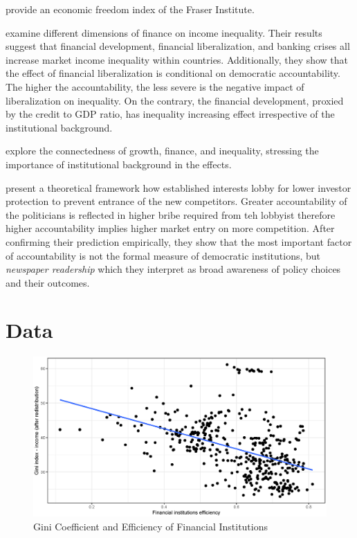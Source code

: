 \documentclass[a4paper,11pt]{article}
\begin{document}
\citet{gwartney2017} provide an economic freedom index of the Fraser Institute.

\citet{de2017finance} examine different dimensions of finance on income inequality. Their results suggest that financial development, financial liberalization, and banking crises all increase market income inequality within countries. Additionally, they show that the effect of financial liberalization is conditional on democratic accountability. The higher the accountability, the less severe is the negative impact of liberalization on inequality. On the contrary, the financial development, proxied by the credit to GDP ratio, has inequality increasing effect irrespective of the institutional background.

\citet{claessens2007finance} explore the connectedness of growth, finance, and inequality, stressing the importance of institutional background in the effects.  

\citet{perottivolpin2004} present a theoretical framework how established interests lobby for lower investor protection to prevent entrance of the new competitors. Greater accountability of the politicians is reflected in higher bribe required from teh lobbyist therefore higher accountability implies higher market entry on more competition. After confirming their prediction empirically, they show that the most important factor of accountability is not the formal measure of democratic institutions, but \emph{newspaper readership} which they interpret as broad awareness of policy choices and their outcomes.

\section{Data}
\begin{figure}
    \caption{Gini Coefficient and Efficiency of Financial Institutions}
    \label{fig:ginifie}
\includegraphics[width=\textwidth, keepaspectratio]{figures/FIEGiniNet}
\end{figure}
\end{document}
